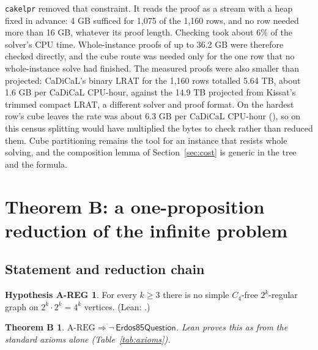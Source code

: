 \documentclass{anvil-paper}
\newcommand{\repobase}{https://github.com/rjwalters/lean-genius/blob/erdos85/integration}
\newcommand{\repofile}[2]{\href{\repobase/#1}{\lean{#2}}}
\newcommand{\AREG}{\mathrm{A\text{-}REG}}
\newcommand{\Qn}{\textsf{Erdos85Question}}
\newcommand{\cakelpr}{\texttt{cake\textunderscore lpr}}
\newtheorem*{theoremB}{Theorem B}
\theoremstyle{definition}
\newtheorem*{hypAREG}{Hypothesis A-REG}
\begin{document}
\cakelpr{} removed that constraint. It reads the proof as a stream with a heap fixed in advance: 4 GB sufficed for 1,075 of the 1,160 rows, and no row needed more than 16 GB, whatever its proof length. Checking took about 6\% of the solver's CPU time. Whole-instance proofs of up to 36.2 GB were therefore checked directly, and the cube route was needed only for the one row that no whole-instance solve had finished. The measured proofs were also smaller than projected: CaDiCaL's binary LRAT for the 1,160 rows totalled 5.64 TB, about 1.6 GB per CaDiCaL CPU-hour, against the 14.9 TB projected from Kissat's trimmed compact LRAT, a different solver and proof format. On the hardest row's cube leaves the rate was about 6.3 GB per CaDiCaL CPU-hour (\repofile{research/problems/erdos-85-wip-01/h1_cert_full_20261001/receipts/pilot_h1_81494a_leaf_solves.jsonl}{pilot_h1_81494a_leaf_solves.jsonl}), so on this census splitting would have multiplied the bytes to check rather than reduced them. Cube partitioning remains the tool for an instance that resists whole solving, and the composition lemma of Section~\ref{sec:cost} is generic in the tree and the formula.

\section{Theorem B: a one-proposition reduction of the infinite problem}\label{sec:theoremB}

\subsection{Statement and reduction chain}\label{sec:chain}

\begin{hypAREG}
For every $k\ge 3$ there is no simple $C_4$-free $2^k$-regular graph on $2^k\cdot 2^k=4^k$ vertices. (Lean: .)
\end{hypAREG}

\begin{theoremB}
$\AREG\Rightarrow\neg\,\Qn$. Lean proves this as  from the standard axioms alone (Table~\ref{tab:axioms}).
\end{theoremB}
\end{document}
